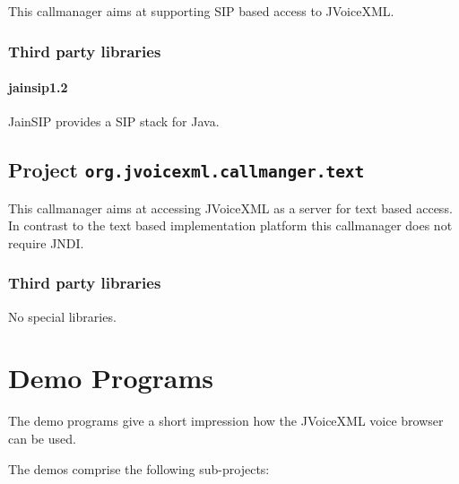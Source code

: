 \documentclass[11pt,a4paper]{article}
\begin{document}
This callmanager aims at supporting SIP based access to JVoiceXML.

\subsubsection{Third party libraries}

\paragraph{jainsip1.2}

JainSIP provides a SIP stack for Java.

\subsection{Project \texttt{org.jvoicexml.callmanger.text}}

This callmanager aims at accessing JVoiceXML as a server for text based
access. In contrast to the text based implementation platform this callmanager
does not require JNDI.

\subsubsection{Third party libraries}

No special libraries.

\section{Demo Programs}

The demo programs give a short impression how the JVoiceXML voice browser can
be used.

The demos comprise the following sub-projects:
\end{document}
